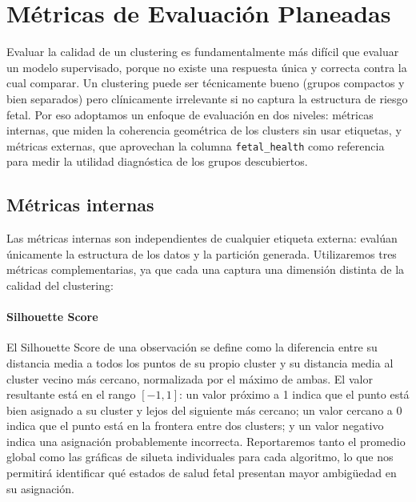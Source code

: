 \documentclass[12pt,letterpaper]{article}
\begin{document}
\section{Métricas de Evaluación Planeadas}

Evaluar la calidad de un clustering es fundamentalmente más difícil que evaluar un modelo
supervisado, porque no existe una respuesta única y correcta contra la cual comparar. Un clustering
puede ser técnicamente bueno (grupos compactos y bien separados) pero clínicamente irrelevante si
no captura la estructura de riesgo fetal. Por eso adoptamos un enfoque de evaluación en dos
niveles: métricas internas, que miden la coherencia geométrica de los clusters sin usar etiquetas,
y métricas externas, que aprovechan la columna \texttt{fetal\_health} como referencia para medir
la utilidad diagnóstica de los grupos descubiertos.

\subsection{Métricas internas}

Las métricas internas son independientes de cualquier etiqueta externa: evalúan únicamente la
estructura de los datos y la partición generada. Utilizaremos tres métricas complementarias, ya
que cada una captura una dimensión distinta de la calidad del clustering:

\paragraph{Silhouette Score}
El Silhouette Score de una observación se define como la diferencia entre su distancia media a
todos los puntos de su propio cluster y su distancia media al cluster vecino más cercano,
normalizada por el máximo de ambas. El valor resultante está en el rango $[-1, 1]$: un valor
próximo a 1 indica que el punto está bien asignado a su cluster y lejos del siguiente más cercano;
un valor cercano a 0 indica que el punto está en la frontera entre dos clusters; y un valor negativo
indica una asignación probablemente incorrecta. Reportaremos tanto el promedio global como las
gráficas de silueta individuales para cada algoritmo, lo que nos permitirá identificar qué estados
de salud fetal presentan mayor ambigüedad en su asignación.
\end{document}
